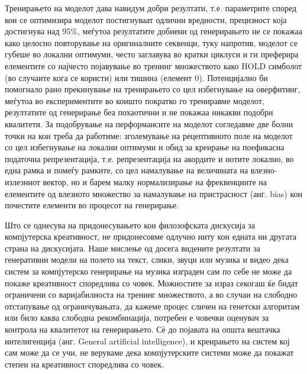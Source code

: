 Тренирањето на моделот дава навидум добри резултати, т.е. параметрите според кои се оптимизира моделот постигнуваат одлични вредности, прецизност која достигнува над 95\%, меѓутоа резултатите добиени од генерирањето не се покажаа како целосно повторување на оригиналните секвенци, туку напротив, моделот се губеше во локални оптимуми, често заглавува во кратки циклуси и ги преферира елементите со најчесто појавување во тренинг множеството како HOLD симболот (во случаите кога се користи) или тишина (елемент 0). Потенцијално би помогнало рано прекинување на тренирањето со цел избегнување на оверфитинг, меѓутоа во експериментите во коишто пократко го трениравме моделот, резултатите од генерирање беа похаотични и не покажаа никакви подобри квалитети. За подобрување на перформансите на моделот согледавме две болни точки на кои треба да работиме: зголемување на рецептивното поле на моделот со цел избегнување на локални оптимуми и обид за креирање на поефикасна податочна репрезентација, т.е. репрезентација на акордите и нотите локално, во една рамка и помеѓу рамките, со цел намалување на величината на влезно-излезниот вектор, но и барем малку нормализирање на фреквенциите на елементите од влезното множество за намалување на пристрасност (анг. bias) кон почестите елементи во процесот на генерирање.

Што се однесува на придонесувањето кон филозофската дискусија за компјутерска креативност, не придонесовме одлучно ниту кон едната ни другата страна на дискусијата. Наше мислење од досега видените резултати за генеративни модели на полето на текст, слики, звуци или музика и видео дека систем за компјутерско генерирање на музика изграден сам по себе не може да покаже креативност споредлива со човек. Можностите за израз секогаш ќе бидат ограничени со варијабилноста на тренинг множеството, а во случаи на слободно отстапување од ограничувањата, да кажеме процес сличен на генетски алгоритам или било каква слободна рекомбинација, потребен е човечки оценувач за контрола на квалитетот на генерирањето. Сѐ до појавата на општа вештачка интелигенција (анг. General artificial intelligence), и креирањето на систем кој сам може да се учи, не веруваме дека компјутерските системи може да покажат степен на креативност споредлива со човек.